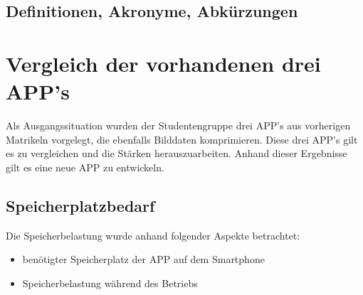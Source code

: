 \subsection{\textbf{Definitionen, Akronyme, Abkürzungen}}
\begin{acronym}[UV-Licht]


\end{acronym}

%
%	


\section{Vergleich der vorhandenen drei APP's}


Als Ausgangssituation wurden der Studentengruppe drei \acs{APP}'s aus vorherigen Matrikeln vorgelegt, die ebenfalls Bilddaten komprimieren. Diese drei \acs{APP}'s gilt es zu vergleichen und die Stärken herauszuarbeiten. Anhand dieser Ergebnisse gilt es eine neue \acs{APP} zu entwickeln.

\subsection{\textbf{Speicherplatzbedarf}}

Die Speicherbelastung wurde anhand folgender Aspekte betrachtet: 
\begin{itemize}
\item benötigter Speicherplatz der APP auf dem Smartphone
\item Speicherbelastung während des Betriebs
\end{itemize}

